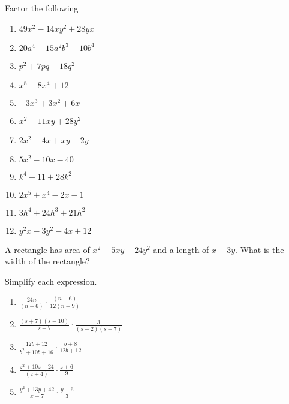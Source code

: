 \documentclass[12pt]{article}
\newenvironment{problem}[2][Problem]{\begin{trivlist}
\item[\hskip \labelsep {\bfseries #1}\hskip \labelsep {\bfseries #2.}]}{\end{trivlist}}
\newenvironment{sol}
    {\emph{Solution:}
    }
    {
    \qed
    }
\begin{document}



\begin{problem}{1}
  Factor the following
  \begin{enumerate}[label=\roman*)]
  \item $49x^2-14xy^2 + 28yx$
  \item $20a^4-15a^2b^3+10b^4$
  \item $p^2+7pq-18q^2$
  \item $x^8-8x^4+12$
  \item $-3x^3+3x^2+6x$
  \item $x^2-11xy+28y^2$
  \item $2x^2 - 4x + xy -2y$
  \item $5x^2 - 10 x -40$
  \item $k^4 - 11 + 28k^2$
  \item $2x^5+x^4-2x-1$
  \item $3h^4+24h^3+21h^2$
  \item $y^2x-3y^2-4x+12$
  \end{enumerate}
  
  
\end{problem}



\begin{problem}{2}
 A rectangle has area of $x^2+5xy-24y^2$ and a length of $x-3y$.  What is the width of the rectangle?
\end{problem}



\begin{problem}{3}
  Simplify each expression.
  \begin{enumerate}[label=\roman*)]
  \item $\displaystyle \frac{24n}{(n+6)}\cdot\frac{(n+6)}{12(n+9)}$
  \item $\displaystyle \frac{(s+7)(s-10)}{s+7}\cdot\frac{3}{(s-2)(s+7)}$
  \item $\displaystyle \frac{12b+12}{b^2+10b+16}\cdot\frac{b+8}{12b+12}$
    \item $\displaystyle \frac{z^2+10z+24}{(z+4)}\cdot\frac{z+6}{9} $
  \item $\displaystyle \frac{y^2+13y+42}{x+7}\cdot\frac{y+6}{3} $

    \end{enumerate}
\end{problem}
\end{document}
